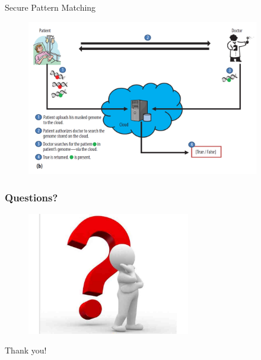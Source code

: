 \documentclass[10pt,xcolor=table]{beamer}
\begin{document}
\begin{frame}{Secure Pattern Matching}
\begin{figure}
  \centering
  \includegraphics[width=4.0in]{doctorpatient}
\end{figure}
\end{frame}
%		


\begin{frame}\frametitle{Questions?}
	\begin{figure}[t]
		\centering
		\includegraphics[width=2.8in]{questions}
	\end{figure}
	\centering
	\color{blue}
	\Huge{Thank you!}
\end{frame}
\end{document}

